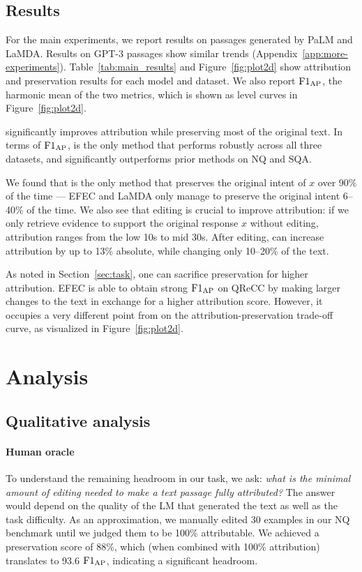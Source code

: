 


\subsection{Results}\label{sec:main-results}

For the main experiments, we report results on passages generated by PaLM and LaMDA. Results on GPT-3 passages show similar trends (Appendix~\ref{app:more-experiments}).
Table~\ref{tab:main_results} and Figure~\ref{fig:plot2d} show attribution and preservation results for each model and dataset. We also report $\text{F1}_\text{AP}{}$, the harmonic mean of the two metrics,
which is shown as level curves in Figure~\ref{fig:plot2d}.

\approach{} significantly improves attribution while preserving most of the original text.
In terms of $\text{F1}_\text{AP}{}$, \approach{} is the only method that performs robustly across all three datasets, and significantly outperforms prior methods on NQ and SQA.

We found that \approach{} is the only method that preserves the original intent of $x$ over 90\% of the time --- EFEC and LaMDA only manage to preserve the original intent 6--40\% of the time.
We also see that editing is crucial to improve attribution: if we only retrieve evidence to support the original response $x$ without editing, attribution ranges from the low 10s to mid 30s. After editing, \approach{} can increase attribution by up to 13\% absolute, while changing only 10--20\% of the text.

As noted in Section~\ref{sec:task},
one can  sacrifice preservation for higher attribution. EFEC is able to obtain strong $\text{F1}_\text{AP}{}$  on QReCC by making larger changes to the text in exchange for a higher attribution score. However, it occupies a very different point from \approach{} on the attribution-preservation trade-off curve, as visualized in Figure~\ref{fig:plot2d}.

\section{Analysis}\label{sec:analysis}

\subsection{Qualitative analysis}

\paragraph{Human oracle} To understand the remaining headroom in our task, we ask: \emph{what is the minimal amount of editing needed to make a text passage fully attributed?}
The answer would depend on the quality of the LM that generated the text as well as the task difficulty.
As an approximation, we manually edited 30 examples in our NQ benchmark until we judged them to be 100\% attributable. We achieved a preservation score of 88\%, which (when combined with 100\% attribution) translates to 93.6 $\text{F1}_\text{AP}{}$, indicating a significant headroom.

